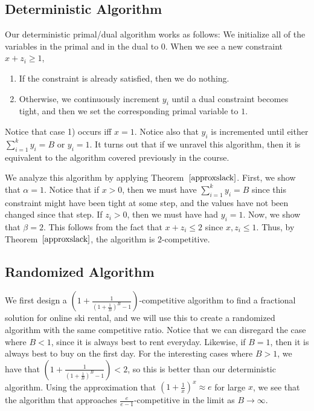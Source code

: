 \documentclass[11pt]{article}
\begin{document}
\subsection{Deterministic  Algorithm}
Our deterministic primal/dual algorithm works as follows: We initialize all of the variables in the primal and in the dual to $0$. When we see a new constraint $x + z_i \ge 1$,
\begin{enumerate}
\item{If the constraint is already satisfied, then we do nothing.}
\item{Otherwise, we continuously increment $y_i$ until a dual constraint becomes tight, and then we set the corresponding primal variable to $1$.}
\end{enumerate}
Notice that case 1) occurs iff $x=1$. Notice also that $y_i$ is incremented until either $\sum_{i=1}^k y_i = B$ or $y_i =1$. It turns out that if we unravel this algorithm, then it is equivalent to the algorithm covered previously in the course.

We analyze this algorithm by applying Theorem~$\ref{approxslack}$. First, we show that $\alpha =1$. Notice that if $x > 0$, then we must have $\sum_{i=1}^{k} y_i = B$ since this constraint might have been tight at some step, and the values have not been changed since that step. If $z_i > 0$, then we must have had $y_i = 1$. Now, we show that $\beta = 2$. This follows from the fact that $x + z_i \le 2$ since $x, z_i \le 1$. Thus, by Theorem~$\ref{approxslack}$, the algorithm is $2$-competitive. 

\subsection{Randomized Algorithm} 
We first design a $\left(1 + \frac{1}{(1+\frac{1}{B})^B - 1}\right)$-competitive algorithm to find a fractional solution for online ski rental, and we will use this to create a randomized algorithm with the same competitive ratio. Notice that we can disregard the case where $B < 1$, since it is always best to rent everyday. Likewise, if $B=1$, then it is always best to buy on the first day. For the interesting cases where $B > 1$, we have that $\left(1 + \frac{1}{(1+\frac{1}{B})^B - 1}\right) < 2$, so this is better than our deterministic algorithm. Using the approximation that $(1+\frac{1}{x})^x \approx e$ for large $x$, we see that the algorithm that approaches $\frac{e}{e-1}$-competitive in the limit as $B \rightarrow \infty$.
\end{document}

